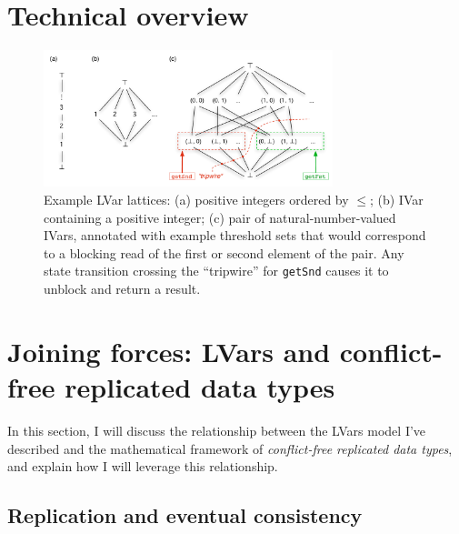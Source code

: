 \documentclass{article}
\begin{document}
\section{Technical overview}\label{s:technical-overview}


\begin{figure}
\centering
\includegraphics[width=0.75\textwidth]{figures/example-lvar-lattices.pdf} 
  \caption{Example LVar lattices: (a) positive integers ordered by
    $\leq$; (b) IVar containing a positive integer; (c) pair of
    natural-number-valued IVars, annotated with example threshold sets
    that would correspond to a blocking read of the first or second
    element of the pair.  Any state transition crossing the
    ``tripwire'' for \lstinline{getSnd} causes it to unblock and
    return a result.}

  \label{f:lattice-examples}
\end{figure}

\section{Joining forces: LVars and conflict-free replicated data types}\label{s:crdts}

In this section, I will discuss the relationship between the LVars
model I've described and the mathematical framework of
\emph{conflict-free replicated data types}, and explain how I will
leverage this relationship.

\subsection{Replication and eventual consistency}
\end{document}

